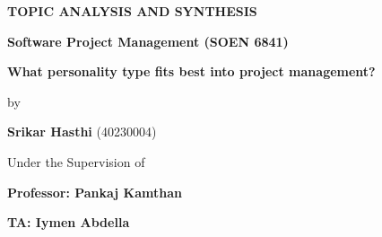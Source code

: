 \begin{titlepage}
\clearpage
\vspace*{\fill}
\begin{center}
    \centering
     
      
  {{\Large \textbf{TOPIC ANALYSIS AND SYNTHESIS}\par}}
    \vspace{1cm}%
     
    \vspace{0.4cm}
    {
    \textbf{\large Software Project Management (SOEN 6841)} \par}
    \vspace{0.2cm}


\vspace{0.5cm}
    {
    \textbf{\Large What personality type fits best into
project management?} \par}
    \vspace{2mm}


    

\vspace{5mm}
    {\large by\par}
    \vspace{0.05cm}
    {\small \textbf{Srikar Hasthi}  (40230004)\par}
    \vspace{0.9cm}
    
    { Under the Supervision of \par}
    {\small \textbf{\textbf{Professor:{ Pankaj Kamthan}}}\par}
    {\small \textbf{\textbf{TA:{ Iymen Abdella}}}\par}
     


\end{center}
\end{titlepage}
